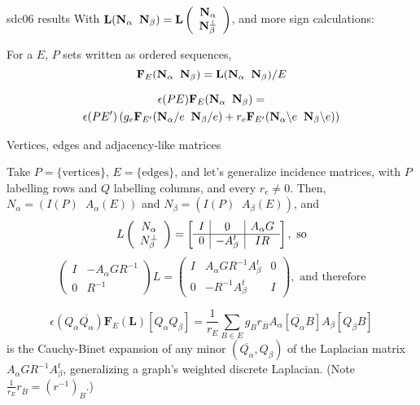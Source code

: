 \documentclass{beamer}
\newcommand{\ext}[1]{\ensuremath{\mathbf{#1}}}
\begin{document}
\begin{frame}{sdc06 results}
  With $\ext{L}(\eNal\;\; \eNbe)=\ext{L}\left(\begin{array}{c}\eNal \\ \eNbePe \end{array} \right)$, and more sign calculations:
    \begin{definition}
      For a $E$, $P$ sets written as ordered sequences,
      \[
      \ext{F}_E(\eNal\;\;\eNbe) = \ext{L}(\eNal\;\;\eNbe)/E
      \]
    \end{definition}
    \begin{theorem}
      \begin{multline*}
        \epsilon(PE)\ext{F}_E(\eNal\;\;\eNbe)=\\
        \epsilon(PE')
        \left(g_e\ext{F}_{E'}(\eNal/e\;\; \eNbe/e) +
      r_e\ext{F}_{E'}(\eNal\backslash e\;\; \eNbe\backslash e)\right)
      \end{multline*}
  \end{theorem}
\end{frame}

\begin{frame}{Vertices, edges and adjacency-like matrices}

  Take $P=\{\text{vertices}\}$, $E=\{\text{edges}\}$, and let's
  generalize incidence matrices, with $P$ labelling rows and
  $Q$ labelling columns, and every $r_e\neq 0$. Then,
  $N_\alpha = ( I(P)\;\; A_\alpha(E))$ and $N_\beta= (I(P)\;\; A_\beta(E))$, and
  \vspace{-0.1in}
   \[
    L\left( \begin{array}{c} N_{\alpha}\\ N_{\beta}^{\perp} \end{array} \right)
    = \left[\begin{array}{c|c|c} I  &  0  &  A_\alpha  G \\  \hline
0  & -A_\beta^t  &  IR \end{array}\right], \text{\ so}
    \]
    \vspace{-0.1in}
    \[
    \left(\begin{array}{cc} I & -A_\alpha  G R^{-1} \\
      0 & R^{-1} \end{array} \right) L
    = \left(\begin{array}{ccc}
        I & A_\alpha GR^{-1}A_\beta^t& 0 \\
        0 & -R^{-1}A_\beta ^t    & I
        \end{array} \right), \text{\ and therefore}
    \]

    \[
    \epsilon(Q_\alpha\overline{Q_\alpha})\ext{F}_E(\ext{L})[Q_\alpha Q_\beta] =
       \frac{1}{r_E} \sum_{B\in E}g_B r_{\overline{B}} A_\alpha[\overline{Q_\alpha} B] A_\beta[{Q_\beta}B]  
    \]
    is the Cauchy-Binet expansion of any  minor $(\overline{Q_\alpha},Q_\beta)$ of the
    Laplacian matrix $A_\alpha GR^{-1}A_\beta^t$, generalizing a graph's weighted
    discrete Laplacian.  (Note $\frac{1}{r_E}r_{\overline B}=(r^{-1})_B$.)
\end{frame}
\end{document}
